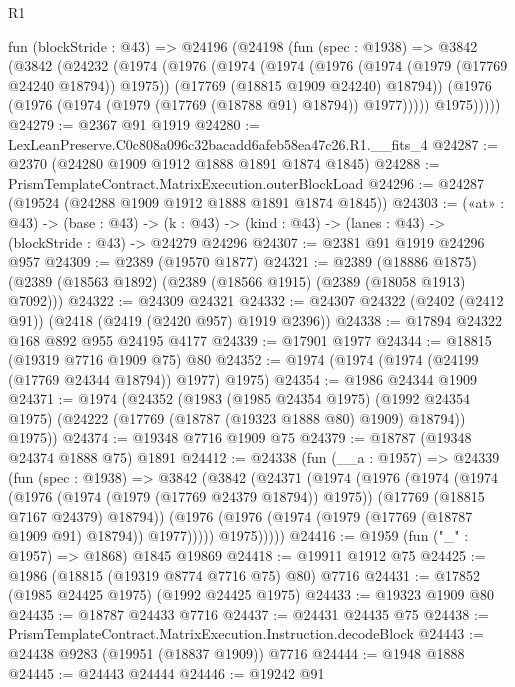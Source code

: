 \begin{lexlean}{R1}
\begin{coremodule}
  fun (blockStride : @43) =>
  @24196
    (@24198
      (fun (spec : @1938) =>
      @3842
        (@3842
          (@24232
            (@1974
              (@1976
                (@1974
                  (@1974
                    (@1976 (@1974 (@1979 (@17769 @24240 @18794)) @1975))
                    (@17769 (@18815 @1909 @24240) @18794))
                  (@1976 (@1976 (@1974 (@1979 (@17769 (@18788 @91) @18794)) @1977)))))
              @1975)))))
@24279 := @2367 @91 @1919
@24280 := LexLeanPreserve.C0c808a096c32bacadd6afeb58ea47c26.R1.__fits_4
@24287 := @2370 (@24280 @1909 @1912 @1888 @1891 @1874 @1845)
@24288 := PrismTemplateContract.MatrixExecution.outerBlockLoad
@24296 := @24287 (@19524 (@24288 @1909 @1912 @1888 @1891 @1874 @1845))
@24303 := («at» : @43) ->
  (base : @43) -> (k : @43) -> (kind : @43) -> (lanes : @43) -> (blockStride : @43) -> @24279 @24296
@24307 := @2381 @91 @1919 @24296 @957
@24309 := @2389 (@19570 @1877)
@24321 := @2389
    (@18886 @1875)
    (@2389 (@18563 @1892) (@2389 (@18566 @1915) (@2389 (@18058 @1913) @7092)))
@24322 := @24309 @24321
@24332 := @24307 @24322 (@2402 (@2412 @91)) (@2418 (@2419 (@2420 @957) @1919 @2396))
@24338 := @17894 @24322 @168 @892 @955 @24195 @4177
@24339 := @17901 @1977
@24344 := @18815 (@19319 @7716 @1909 @75) @80
@24352 := @1974 (@1974 (@1974 (@24199 (@17769 @24344 @18794)) @1977) @1975)
@24354 := @1986 @24344 @1909
@24371 := @1974
    (@24352
      (@1983
        (@1985 @24354 @1975)
        (@1992 @24354 @1975)
        (@24222 (@17769 (@18787 (@19323 @1888 @80) @1909) @18794))
        @1975))
@24374 := @19348 @7716 @1909 @75
@24379 := @18787 (@19348 @24374 @1888 @75) @1891
@24412 := @24338
    (fun (__a : @1957) =>
    @24339
      (fun (spec : @1938) =>
      @3842
        (@3842
          (@24371
            (@1974
              (@1976
                (@1974
                  (@1974
                    (@1976 (@1974 (@1979 (@17769 @24379 @18794)) @1975))
                    (@17769 (@18815 @7167 @24379) @18794))
                  (@1976 (@1976 (@1974 (@1979 (@17769 (@18787 @1909 @91) @18794)) @1977)))))
              @1975)))))
@24416 := @1959 (fun ("_" : @1957) => @1868) @1845 @19869
@24418 := @19911 @1912 @75
@24425 := @1986 (@18815 (@19319 @8774 @7716 @75) @80) @7716
@24431 := @17852 (@1985 @24425 @1975) (@1992 @24425 @1975)
@24433 := @19323 @1909 @80
@24435 := @18787 @24433 @7716
@24437 := @24431 @24435 @75
@24438 := PrismTemplateContract.MatrixExecution.Instruction.decodeBlock
@24443 := @24438 @9283 (@19951 (@18837 @1909)) @7716
@24444 := @1948 @1888
@24445 := @24443 @24444
@24446 := @19242 @91

\end{coremodule}
\end{lexlean}
